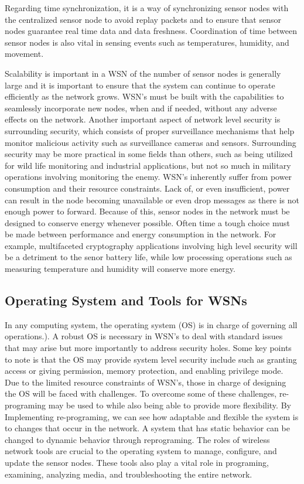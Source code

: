 \smallskip

Regarding time synchronization, it is a way of synchronizing sensor nodes with the centralized sensor node to avoid replay packets and to ensure that sensor nodes guarantee real time data and data freshness. Coordination of time between sensor nodes is also vital in sensing events such as temperatures, humidity, and movement. 

\smallskip

Scalability is important in a WSN of the number of sensor nodes is generally large and it is important to ensure that the system can continue to operate efficiently as the network grows. WSN’s must be built with the capabilities to seamlessly incorporate new nodes, when and if needed, without any adverse effects on the network. Another important aspect of network level security is surrounding security, which consists of proper surveillance mechanisms that help monitor malicious activity such as surveillance cameras and sensors. Surrounding security may be more practical in some fields than others, such as being utilized for wild life monitoring and industrial applications, but not so much in military operations involving monitoring the enemy. WSN’s inherently suffer from power consumption and their resource constraints. Lack of, or even insufficient, power can result in the node becoming unavailable or even drop messages as there is not enough power to forward. Because of this, sensor nodes in the network must be designed to conserve energy whenever possible. Often time a tough choice must be made between performance and energy consumption in the network. For example, multifaceted cryptography applications involving high level security will be a detriment to the senor battery life, while low processing operations such as measuring temperature and humidity will conserve more energy. 

\subsection {Operating System and Tools for WSNs} 

In any computing system, the operating system (OS) is in charge of governing all operations.). A robust OS is necessary in WSN’s to deal with standard issues that may arise but more importantly to address security holes. Some key points to note is that the OS may provide system level security include such as granting access or giving permission, memory protection, and enabling privilege mode. Due to the limited resource constraints of WSN’s, those in charge of designing the OS will be faced with challenges. To overcome some of these challenges, re-programing may be used to while also being able to provide more flexibility. By Implementing re-programing, we can see how adaptable and flexible the system is to changes that occur in the network. A system that has static behavior can be changed to dynamic behavior through reprograming. The roles of wireless network tools are crucial to the operating system to manage, configure, and update the sensor nodes. These tools also play a vital role in programing, examining, analyzing media, and troubleshooting the entire network. 

